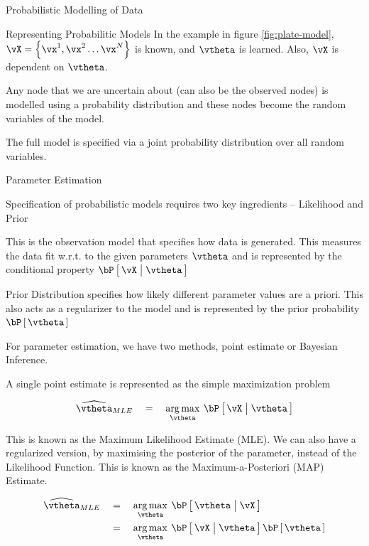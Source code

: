 \documentclass{article}
\begin{document}
\begin{ssection}{Probabilistic Modelling of Data}
\begin{ssubsection}{Representing Probabilitic Models}
		In the example in figure \ref{fig:plate-model}, $\vX = \set{\vx^1, \vx^2 \dots \vx^N}$ is known, and $\vtheta$ is learned. Also, $\vX$ is dependent on $\vtheta$. \br

		 \br

		Any node that we are uncertain about (can also be the observed nodes) is modelled using a probability distribution and these nodes become the random variables of the model. \br

		The full model is specified via a joint probability distribution over all random variables.

	\end{ssubsection}

	\begin{ssubsection}{Parameter Estimation}

		Specification of probabilistic models requires two key ingredients -- Likelihood and Prior \br

		\begin{definition}
			This is the observation model that specifies how data is generated. This measures the data fit w.r.t. to the given parameters $\vtheta$ and is represented by the conditional property $\prob{\vX \pipe \vtheta}$
		\end{definition}

		\begin{definition}
			Prior Distribution specifies how likely different parameter values are a priori. This also acts as a regularizer to the model and is represented by the prior probability $\prob{\vtheta}$
		\end{definition}

		For parameter estimation, we have two methods, point estimate or Bayesian Inference. \br

		A single point estimate is represented as the simple maximization problem

		\begin{align*}
			\widehat{\vtheta}_{MLE}	\eq	\argmax{\vtheta} \prob{\vX \pipe \vtheta}
		\end{align*}

		This is known as the Maximum Likelihood Estimate (MLE). We can also have a regularized version, by maximising the posterior of the parameter, instead of the Likelihood Function. This is known as the Maximum-a-Posteriori (MAP) Estimate. \br

		\begin{align*}
			\widehat{\vtheta}_{MLE}	&\eq	\argmax{\vtheta} \prob{\vtheta \pipe \vX} \\
									&\eq	\argmax{\vtheta} \prob{\vX \pipe \vtheta} \prob{\vtheta}
		\end{align*}
		

\end{ssubsection}
\end{ssection}
\end{document}
